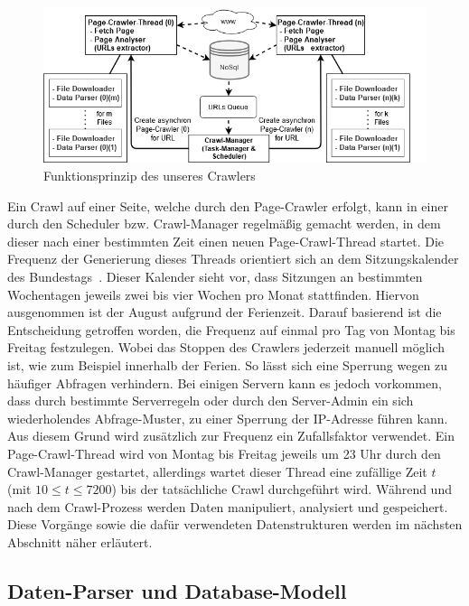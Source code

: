 \begin{figure}[H]
    \centering
    \includegraphics[width=5in]{images/02-Crawler/Crawler-Process-Diagram (Multithreading).png}
    \caption{Funktionsprinzip des unseres Crawlers}
    \label{fig:funktionsprinzipCrawler}
\end{figure}


\noindent
Ein Crawl auf einer Seite, welche durch den Page-Crawler erfolgt, kann in einer durch den Scheduler bzw. Crawl-Manager regelmäßig gemacht werden, in dem dieser nach einer bestimmten Zeit einen neuen Page-Crawl-Thread startet. Die Frequenz der Generierung dieses Threads orientiert sich an dem Sitzungskalender des Bundestags~\cite{Sitzungskalender2021}. Dieser Kalender sieht vor, dass Sitzungen an bestimmten Wochentagen jeweils zwei bis vier Wochen pro Monat stattfinden. Hiervon ausgenommen ist der August aufgrund der Ferienzeit. Darauf basierend ist die Entscheidung getroffen worden, die Frequenz auf einmal pro Tag von Montag bis Freitag festzulegen. Wobei das Stoppen des Crawlers jederzeit manuell möglich ist, wie zum Beispiel innerhalb der Ferien. So lässt sich eine Sperrung wegen zu häufiger Abfragen verhindern. Bei einigen Servern kann es jedoch vorkommen, dass durch bestimmte Serverregeln oder durch den Server-Admin ein sich wiederholendes Abfrage-Muster, zu einer Sperrung der IP-Adresse führen kann. Aus diesem Grund wird zusätzlich zur Frequenz ein Zufallsfaktor verwendet. Ein Page-Crawl-Thread wird von Montag bis Freitag jeweils um 23 Uhr durch den Crawl-Manager gestartet, allerdings wartet dieser Thread eine zufällige Zeit $t$ (mit $10 \leq t \leq 7200 $) bis der tatsächliche Crawl durchgeführt wird. Während und nach dem Crawl-Prozess werden Daten manipuliert, analysiert und gespeichert. Diese Vorgänge sowie die dafür verwendeten Datenstrukturen werden im nächsten Abschnitt näher erläutert. 

\subsection{Daten-Parser und Database-Modell}

